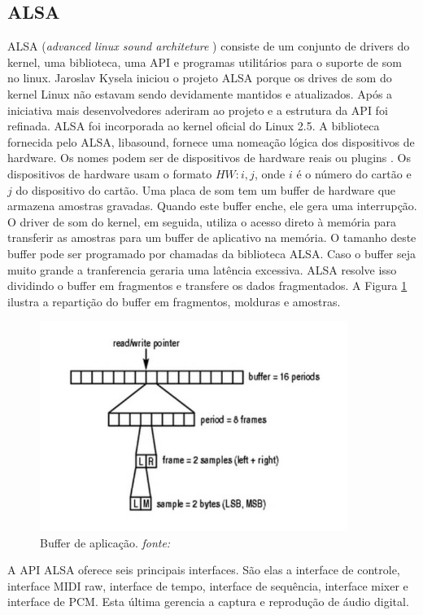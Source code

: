 \subsection{ALSA}
\quad ALSA (\textit{advanced linux sound architeture }) consiste de um conjunto de drivers do kernel, uma biblioteca, uma API e programas utilitários para o suporte de som no linux. Jaroslav Kysela iniciou o projeto ALSA porque os drives de som do kernel Linux não estavam sendo devidamente mantidos e atualizados. Após  a iniciativa mais desenvolvedores aderiram ao projeto e a estrutura da API foi refinada. ALSA foi incorporada ao kernel oficial do Linux 2.5.
A biblioteca fornecida pelo ALSA, libasound, fornece uma nomeação lógica dos dispositivos de hardware. Os nomes podem ser de dispositivos de hardware reais ou plugins \cite{linux}. Os dispositivos de hardware usam o formato $HW:i,j$, onde $i$ é o número do cartão e $j$ do dispositivo do cartão. Uma placa de som tem um buffer de hardware que armazena amostras gravadas. Quando este buffer enche, ele gera uma interrupção. O driver de som do kernel, em seguida, utiliza o acesso direto à memória  para transferir as amostras para um buffer de aplicativo na memória. O tamanho deste buffer pode ser  programado por chamadas da biblioteca ALSA. Caso o buffer seja muito grande a tranferencia geraria uma latência excessiva. ALSA resolve isso dividindo o buffer em fragmentos e transfere os dados fragmentados. A Figura \ref{fig:pcm} ilustra a repartição do buffer em fragmentos, molduras e amostras.

\begin{figure}[H]
\centering %
\includegraphics[width=10cm]{img/pcm.jpg} %
\caption{Buffer de aplicação. \textit{fonte:\cite{linux}}}
\label{fig:pcm}
\end{figure}

\quad A API ALSA oferece seis principais interfaces. São elas  a interface de controle, interface MIDI raw, interface de tempo, interface de sequência, interface mixer e interface de PCM. Esta última gerencia a captura e reprodução de áudio digital. 


